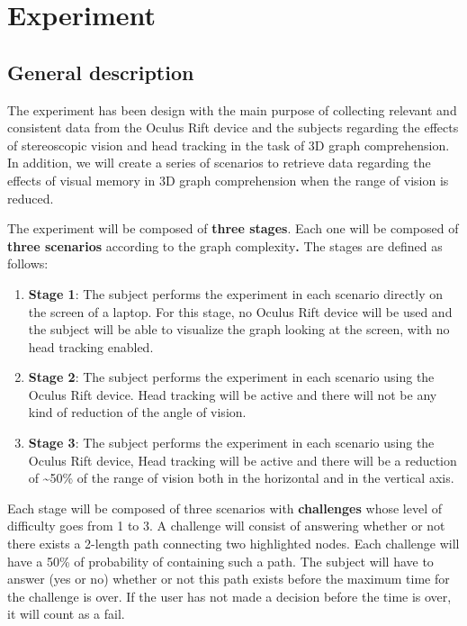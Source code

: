 \chapter{Experiment}

\section{General description}\label{general-description}

The experiment has been design with the main purpose of collecting relevant
and consistent data from the Oculus Rift device and the subjects
regarding the effects of stereoscopic vision and head tracking in the
task of 3D graph comprehension. In addition, we will create a series of
scenarios to retrieve data regarding the effects of visual memory in
3D graph comprehension when the range of vision is reduced.

The experiment will be composed of \textbf{three stages}. Each one will
be composed of \textbf{three scenarios} according to the graph
complexity\textbf{.} The stages are defined as follows:

\begin{enumerate}
\def\labelenumi{\arabic{enumi}.}
\item
  \textbf{Stage 1}: The subject performs the experiment in each scenario
  directly on the screen of a laptop. For this stage, no Oculus Rift
  device will be used and the subject will be able to visualize the
  graph looking at the screen, with no head tracking enabled.
\item
  \textbf{Stage 2}: The subject performs the experiment in each scenario
  using the Oculus Rift device. Head tracking will be active and there
  will not be any kind of reduction of the angle of vision.
\item
  \textbf{Stage 3}: The subject performs the experiment in each scenario
  using the Oculus Rift device, Head tracking will be active and there
  will be a reduction of \textasciitilde{}50\% of the range of vision
  both in the horizontal and in the vertical axis.
\end{enumerate}

Each stage will be composed of three scenarios with \textbf{challenges}
whose level of difficulty goes from 1 to 3. A challenge will consist of
answering whether or not there exists a 2-length path connecting two highlighted
nodes. Each challenge will have a 50\% of probability of containing such
a path. The subject will have to answer (yes or no) whether or not this
path exists before the maximum time for the challenge is over. If the
user has not made a decision before the time is over, it will count as a
fail.

